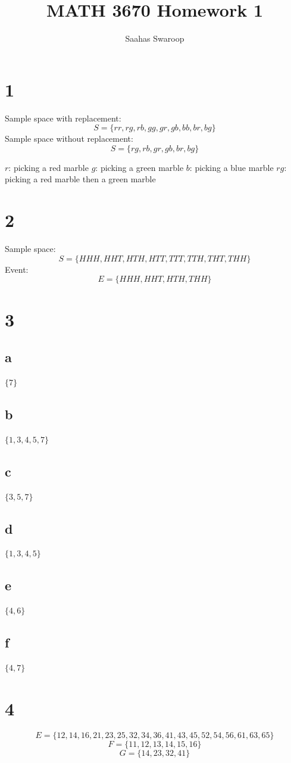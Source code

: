 \documentclass[12pt]{article}
\title{\textbf{MATH 3670 Homework 1}}
\author{Saahas Swaroop}
\begin{document}
  \maketitle
  \pagebreak
  

  \section*{1}
  Sample space with replacement: $$ S = \{rr, rg, rb, gg, gr, gb, bb, br, bg\} $$
  Sample space without replacement: $$ S = \{rg, rb ,gr, gb, br, bg\} $$

  $r$: picking a red marble
  $g$: picking a green marble
  $b$: picking a blue marble
  $rg$: picking a red marble then a green marble

  \section*{2}
  Sample space: $$S = \{HHH, HHT, HTH, HTT, TTT, TTH, THT, THH\}$$
  Event: $$E = \{HHH, HHT, HTH, THH\}$$

  \section*{3}
  \subsection*{a}
  $\{7\}$
  \subsection*{b}
  $\{1, 3, 4, 5, 7\}$
  \subsection*{c}
  $\{3, 5, 7\}$
  \subsection*{d}
  $\{1, 3, 4, 5\}$
  \subsection*{e}
  $\{4, 6\}$
  \subsection*{f}
  $\{4, 7\}$

  \section*{4}
  $$ E = \{12, 14, 16, 21, 23, 25, 32, 34, 36, 41, 43, 45, 52, 54, 56, 61, 63, 65\} $$
  $$ F = \{11, 12, 13, 14, 15, 16\} $$
  $$ G = \{14, 23, 32, 41\} $$
\end{document}

